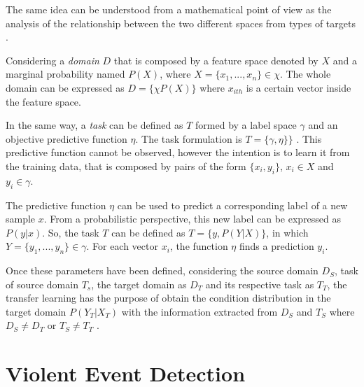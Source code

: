 	The same idea can be understood from a mathematical point of view as the analysis of the relationship between the two different spaces from types of targets \cite{Pan2010}. 
	
	Considering a \textit{domain} $D$ that is composed by a feature space denoted by $X$ and a marginal probability named $P(X)$, where $X = \{x_1,..., x_n\} \in \chi$. The whole domain can be expressed as $D = \{\chi P(X)\}$  where $x_{ith}$  is a certain vector inside the feature space.
	
	In the same way, a \textit{task} can be defined as $T$ formed by a label space $\gamma$ and an objective predictive function $\eta$. The task formulation is $T = \{\gamma, \eta\}\}$ . This predictive function cannot be observed, however the intention is to learn it from the training data, that is composed by pairs of the form $\{x_i, y_i\}$, $x_i \in X$ and $y_i \in \gamma$.
	
	The predictive function $\eta$ can be used to predict a corresponding label of a new sample $x$. From a probabilistic perspective, this new label can be expressed as $P(y|x)$. So, the task $T$ can be defined as $T = \{y, P(Y|X)\}$, in which $Y = \{y_1,..., y_n\} \in \gamma$. For each vector $x_i$, the function $\eta$ finds a prediction $y_i$.
	
	Once these parameters have been defined, considering the source domain $D_S$, task of source domain $T_s$, the target domain as $D_T$ and its respective task as $T_T$, the transfer learning has the purpose of obtain the condition distribution in the target domain $P(Y_T|X_T)$ with the information extracted from $D_S$ and $T_S$ where $D_S \neq D_T$ or $T_S \neq T_T$ \cite{Ruder2017}.
	
	
\section{Violent Event Detection}


